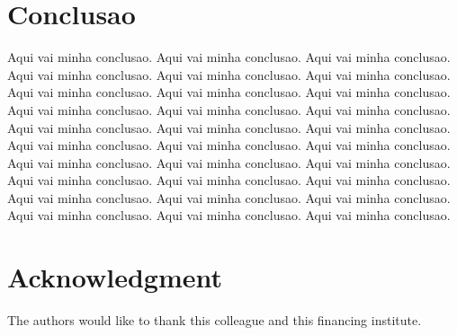 \documentclass[10pt, conference]{IEEEtran}
\begin{document}
%


\section{Conclusao}
%
Aqui vai minha conclusao. Aqui vai minha conclusao. Aqui vai minha conclusao. Aqui vai minha conclusao. Aqui vai minha conclusao. Aqui vai minha conclusao. Aqui vai minha conclusao. Aqui vai minha conclusao. Aqui vai minha conclusao. Aqui vai minha conclusao. Aqui vai minha conclusao. Aqui vai minha conclusao. Aqui vai minha conclusao. Aqui vai minha conclusao. Aqui vai minha conclusao. Aqui vai minha conclusao. Aqui vai minha conclusao. Aqui vai minha conclusao. Aqui vai minha conclusao. Aqui vai minha conclusao. Aqui vai minha conclusao. Aqui vai minha conclusao. Aqui vai minha conclusao. Aqui vai minha conclusao. Aqui vai minha conclusao. Aqui vai minha conclusao. Aqui vai minha conclusao. Aqui vai minha conclusao. Aqui vai minha conclusao. Aqui vai minha conclusao.


\iffinal
\section*{Acknowledgment}
%
The authors would like to thank this colleague and this financing institute.
\fi







\end{document}
